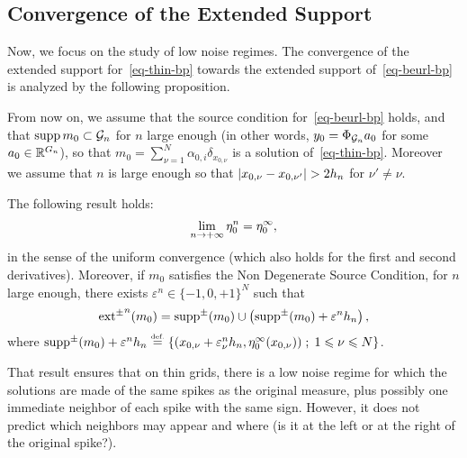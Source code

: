 


\subsection{Convergence of the Extended Support}

Now, we focus on the study of low noise regimes. The convergence of the extended support for~\eqref{eq-thin-bp} towards the extended support of~\eqref{eq-beurl-bp} is analyzed by the following proposition.

From now on, we assume that the source condition for~\eqref{eq-beurl-bp} holds, and that $\operatorname{supp} m_0\subset \mathcal{G}_n$ for $n$ large enough (in other words, $y_0=\Phi_{\mathcal{G}_n} a_0$ for some $a_0\in \mathbb{R}^{{G_n}}$), so that $m_0=\sum_{\nu=1}^N\alpha_{0,i}\delta_{x_{0,\nu}}$ is a solution of~\eqref{eq-thin-bp}. Moreover we assume that $n$ is large enough so that $|x_{0,\nu}-x_{0,\nu'}|> {2}{\stepsizen}$ for $\nu'\neq \nu$. 


\begin{prop}
  The following result holds:
  \begin{align}
    \lim_{n\to +\infty} {\eta_0^n} = {\eta_0^{\infty}},
  \end{align}
  in the sense of the uniform convergence (which also holds for the first and second derivatives). Moreover, if $m_0$ satisfies the Non Degenerate Source Condition, for $n$ large enough, there exists $\varepsilon^n\in\{-1,0,+1\}^N$ such that
\begin{align}
\operatorname{ext^{\pm}}^{n}(m_0) =\operatorname{supp^{\pm}}(m_0) \cup \left(\operatorname{supp^{\pm}}(m_0) + \varepsilon^n {h_n} \right), 
\end{align}
where $\operatorname{supp^{\pm}}(m_0) + \varepsilon^n {h_n} \stackrel{\mbox{\upshape\tiny def.}}{=} \left\{  (x_{0,\nu}+\varepsilon^n_\nu h_n,{\eta_0^{\infty}}(x_{0,\nu}))  \;;\;  1\leqslant \nu\leqslant N  \right\}$.
\label{prop-extsupp}
\end{prop}

That result ensures that on thin grids, there is a low noise regime for which the solutions are made of the same spikes as the original measure, plus possibly one immediate neighbor of each spike with the same sign. However, it does not predict which neighbors may appear and where (is it at the left or at the right of the original spike?).

